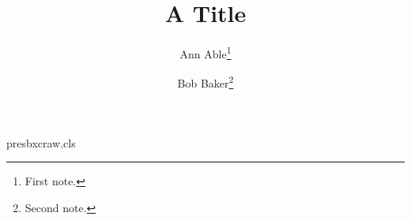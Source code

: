 \begin{filecontents*}[overwrite]{presbxcraw.cls}
\renewcommand\title[1]{\gdef\@title{#1}\gdef\mytitle{#1}}
\long\def\maketitle{\par\begingroup\@maketitle\@thanks\endgroup\setcounter{footnote}{0}\global\let\thanks\relax\global\let\maketitle\relax}
\end{filecontents*}
\documentclass{presbxcraw}
\title{A Title}
\author{Ann Able\thanks{First note.} \and Bob Baker\thanks{Second note.}}

\makeatletter
Before: \ifdefined\lx@dropped@title kept\else lost\fi; \ifdefined\lx@dropped@maketitle kept\else lost\fi.
\makeatother
\maketitle
\makeatletter
\global\let\title\relax
After: \ifdefined\lx@dropped@title kept\else lost\fi; \ifdefined\lx@dropped@maketitle kept\else lost\fi.
\makeatother


